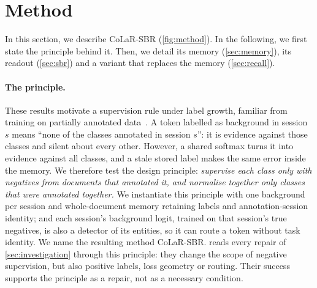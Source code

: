\documentclass[10pt,twocolumn,letterpaper]{article}
\begin{document}
\section{Method}
\label{sec:design}
In this section, we describe CoLaR-SBR (\cref{fig:method}). In the following, we first state the principle behind it. Then, we detail its memory (\cref{sec:memory}), its readout (\cref{sec:sbr}) and a variant that replaces the memory (\cref{sec:recall}).

\paragraph{The principle.} These results motivate a supervision rule under label growth, familiar from training on partially annotated data~\citep{greenberg2018marginal}. A token labelled as background in session $s$ means ``none of the classes annotated in session $s$'': it is evidence against those classes and silent about every other. However, a shared softmax turns it into evidence against all classes, and a stale stored label makes the same error inside the memory. We therefore test the design principle: \emph{supervise each class only with negatives from documents that annotated it, and normalise together only classes that were annotated together.} We instantiate this principle with one background per session and whole-document memory retaining labels and annotation-session identity; and each session's background logit, trained on that session's true negatives, is also a detector of its entities, so it can route a token without task identity. We name the resulting method CoLaR-SBR.  reads every repair of \cref{sec:investigation} through this principle: they change the scope of negative supervision, but also positive labels, loss geometry or routing. Their success supports the principle as a repair, not as a necessary condition.

\begin{table}[t]
\centering\footnotesize
\setlength{\tabcolsep}{3pt}
\caption{\textbf{One principle, six repairs} (CIL-CORD, same CoLaR memory, full-label F1). How each repair treats a stored background label. $^{r}$Oracle: reads the true labels.}
\label{tab:scope}
\end{table}
\end{document}
